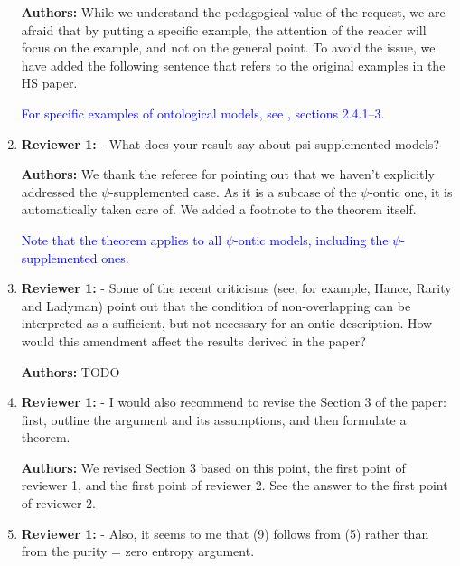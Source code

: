 \documentclass[11pt, executivepaper]{article}
\begin{document}
\begin{enumerate}
\textbf{Authors:} While we understand the pedagogical value of the request, we are afraid that by putting a specific example, the attention of the reader will focus on the example, and not on the general point. To avoid the issue, we have added the following sentence that refers to the original examples in the HS paper.

\textcolor{blue}{ For specific examples of ontological models, see \cite{Harrigan:2010}, sections 2.4.1--3. }

\item \textbf{Reviewer 1:} - What does your result say about psi-supplemented models?
\vspace{2mm}

\textbf{Authors:} We thank the referee for pointing out that we haven't explicitly addressed the $\psi$-supplemented case. As it is a subcase of the $\psi$-ontic one, it is automatically taken care of. We added a footnote to the theorem itself.

\textcolor{blue}{ Note that the theorem applies to all $\psi$-ontic models, including the $\psi$-supplemented ones.}


\item \textbf{Reviewer 1:} - Some of the recent criticisms (see, for example, Hance, Rarity and Ladyman) point out that the condition of non-overlapping can be interpreted as a sufficient, but not necessary for an ontic description. How would this amendment affect the results derived in the paper?
\vspace{2mm}

\textbf{Authors:} TODO 

\item \textbf{Reviewer 1:} - I would also recommend to revise the Section 3 of the paper: first, outline the argument and its assumptions, and then formulate a theorem.
\vspace{2mm}

\textbf{Authors:} We revised Section 3 based on this point, the first point of reviewer 1, and the first point of reviewer 2. See the answer to the first point of reviewer 2.

\item \textbf{Reviewer 1:}  - Also, it seems to me that (9) follows from (5) rather than from the purity = zero entropy argument.
\vspace{2mm}


\end{enumerate}
\end{document}
